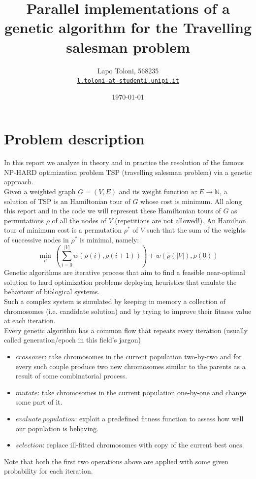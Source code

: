 \documentclass[11pt]{article}
\title{Parallel implementations of a genetic algorithm for the Travelling salesman problem}
\author{Lapo Toloni, 568235 \\%
    \href{l.toloni-at-studenti.unipi.it}{\texttt{l.toloni-at-studenti.unipi.it}}}
\date{\today}
\begin{document}
\maketitle

\section{Problem description} %
In this report we analyze in theory and in practice the resolution of the famous NP-HARD optimization problem TSP (travelling salesman problem) via a genetic approach.\\
Given a weighted graph $ G=(V,E) $ and its weight function $ w: E \longrightarrow \mathbb{N}$, a solution of TSP is an Hamiltonian tour of $ G $ whose cost is minimum. 
All along this report and in the code we will represent these Hamiltonian tours of $ G $ as permutations $ \rho $ of all the nodes of $ V $  (repetitions are not allowed!). An Hamilton tour of minimum cost is a permutation $ \rho^*$ of $ V $ such that the sum of the weights of successive nodes in $ \rho^* $ is minimal, namely:
\[ \min_{\rho}\ (\sum_{i=0}^{|V|} w(\rho(i),\rho(i+1))) + w(\rho(|V|), \rho(0))  \]
Genetic algorithms are iterative process that aim to find a feasible near-optimal solution to hard optimization problems deploying heuristics that emulate the behaviour of biological systems.\\
Such a complex system is simulated by keeping in memory a collection of chromosomes (i.e. candidate solution) and by trying to improve their fitness value at each iteration. \\
Every genetic algorithm has a common flow that repeats every iteration (usually called generation/epoch in this field's jargon)
\begin{itemize}
	\item $ crossover $: take chromosomes in the current population two-by-two and for every such couple produce two new chromosomes similar to the parents as a result of some combinatorial process.
	\item $ mutate $: take chromosomes in the current population one-by-one and change some part of it.
	\item $ evaluate\ population$: exploit a predefined fitness function to assess how well our population is behaving.
	\item $ selection $: replace ill-fitted chromosomes with copy of the current best ones.
\end{itemize}
Note that both the first two operations above are applied with some given probability for each iteration.
\end{document}

